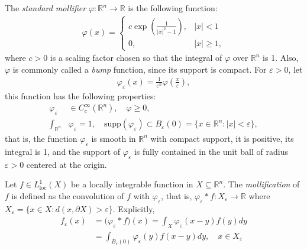 The \textit{standard mollifier} $\varphi:\mathbb R^n\to\mathbb R$ is the following function:
\begin{align*}
\varphi(x) = \left\{\begin{array}{ll}
c\exp\left(\frac{1}{|x|^2-1}\right), & |x| <1\\
0, & |x|\ge 1,
\end{array}
\right.
\end{align*}
where $c>0$ is a scaling factor chosen so that the integral of $\varphi$ over $\mathbb R^n$ is 1. Also, $\varphi$ is commonly called a \textit{bump} function, since its support is compact. For $\varepsilon>0$, let
\begin{align*}
\varphi_\varepsilon(x) = \frac{1}{\varepsilon^n}\varphi\left(\frac{x}{\varepsilon}\right),
\end{align*} 
this function has the following properties:
\begin{align*}
\varphi_\varepsilon&\in C_c^\infty(\mathbb R^n),\quad
\varphi\ge 0,\\
\int_{\mathbb R^n}&\varphi_\varepsilon =1,\quad
\text{supp}(\varphi_\varepsilon)\subset B_\varepsilon(0)=\{x\in\mathbb R^n:|x|<\varepsilon\},
\end{align*}
that is, the function $\varphi_\varepsilon$ is smooth in $\mathbb R^n$ with compact support, it is positive, its integral is 1, and the support of $\varphi_\varepsilon$ is fully contained in the unit ball of radius $\varepsilon>0$ centered at the origin.
  
Let $f\in L_{\text{loc}}^1(X)$ be a locally integrable function in $X \subseteq\mathbb R^n$. The \textit{mollification} of $f$ is defined as the convolution of $f$ with $\varphi_\varepsilon$, that is, $\varphi_\varepsilon*f:X_\varepsilon\to\mathbb R$ where $X_\varepsilon=\{x\in X: d(x,\partial X)>\varepsilon\}$. Explicitly,
\begin{align*}
f_\varepsilon(x)
  &= \big(\varphi_\varepsilon * f\big)(x)
  = \int_X\varphi_\varepsilon(x-y)f(y)dy\\
  &= \int_{B_\varepsilon(0)}\varphi_\varepsilon(y)f(x-y)dy,\quad x\in X_\varepsilon
\end{align*}

